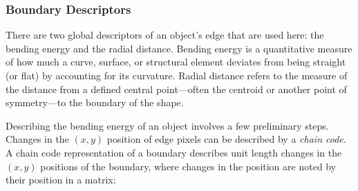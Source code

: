 \documentclass[letterpaper]{report}
\begin{document}
{\subsubsection{Boundary Descriptors}
There are two global descriptors of an object's edge that are used here: the bending energy and the radial distance.  Bending energy is a quantitative measure of how much a curve, surface, or structural element deviates from being straight (or flat) by accounting for its curvature. Radial distance refers to the measure of the distance from a defined central point—often the centroid or another point of symmetry—to the boundary of the shape.

Describing the bending energy of an object involves a few preliminary steps. Changes in the $(x,y)$ position of edge pixels can be described by a \textit{chain code}. A chain code representation of a boundary describes unit length changes in the $(x,y)$ positions of the boundary,  where changes in the position are noted by their position in a matrix:

}
\end{document}
